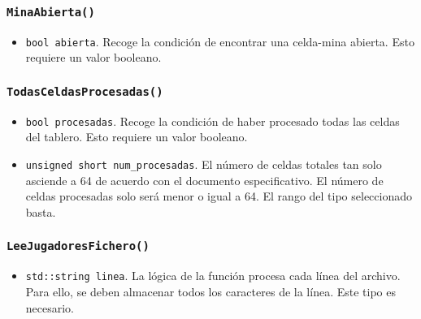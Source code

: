 \documentclass[12pt]{article}
\begin{document}
\subsubsection*{\texttt{MinaAbierta()}}

\begin{itemize}

\item \texttt{bool abierta}. Recoge la condición de encontrar una
celda-mina abierta. Esto requiere un valor booleano.

\end{itemize}

\subsubsection*{\texttt{TodasCeldasProcesadas()}}

\begin{itemize}

\item \texttt{bool procesadas}. Recoge la condición de haber procesado
todas las celdas del tablero. Esto requiere un valor booleano.

\item \texttt{unsigned short num_procesadas}. El número de celdas
totales tan solo asciende a 64 de acuerdo con el documento especificativo. El
número de celdas procesadas solo será menor o igual a 64. El rango del tipo
seleccionado basta.

\end{itemize}

\subsubsection*{\texttt{LeeJugadoresFichero()}}

\begin{itemize}

\item \texttt{std::string linea}. La lógica de la función procesa cada
línea del archivo. Para ello, se deben almacenar todos los caracteres de la
línea. Este tipo es necesario.

\end{itemize}
\end{document}
